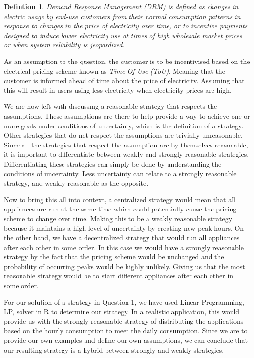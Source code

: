 \documentclass[
11pt, %
english, %
singlespacing, %
parskip, %
headsepline, %
]{report} %
\newtheorem{definition}[theorem]{Defintion}
\begin{document}
	\begin{definition}
	    Demand Response Management (DRM) is defined as changes in electric usage by end‐use customers from their normal consumption patterns in response to changes in the price of electricity over time, or to incentive payments designed to induce lower electricity use at times of high wholesale market prices or when system reliability is jeopardized\cite{defDRM}.
	\end{definition}


	As an assumption to the question, the customer is to be incentivised based on the electrical pricing scheme known as \emph{Time-Of-Use (ToU)}. Meaning that the customer is informed ahead of time about the price of electricity. Assuming that this will result in users using less electricity when electricity prices are high.

	We are now left with discussing a reasonable strategy that respects the assumptions. These assumptions are there to help provide a way to achieve one or more goals under conditions of uncertainty, which is the definition of a strategy. Other strategies that do not respect the assumptions are trivially unreasonable. Since all the strategies that respect the assumption are by themselves reasonable, it is important to differentiate between weakly and strongly reasonable strategies. Differentiating these strategies can simply be done by understanding the conditions of uncertainty. Less uncertainty can relate to a strongly reasonable strategy, and weakly reasonable as the opposite.

	Now to bring this all into context, a centralized strategy would mean that all appliances are run at the same time which could potentially cause the pricing scheme to change over time. Making this to be a weakly reasonable strategy because it maintains a high level of uncertainty by creating new peak hours. On the other hand, we have a decentralized strategy that would run all appliances after each other in some order. In this case we would have a strongly reasonable strategy by the fact that the pricing scheme would be unchanged and the probability of occurring peaks would be highly unlikely. Giving us that the most reasonable strategy would be to start different appliances after each other in some order.

	For our solution of a strategy in Question 1, we have used Linear Programming, LP, solver in R to determine our strategy. In a realistic application, this would provide us with the strongly reasonable strategy of distributing the applications based on the hourly consumption to meet the daily consumption. Since we are to provide our own examples and define our own assumptions, we can conclude that our resulting strategy is a hybrid between strongly and weakly strategies.
\end{document}
